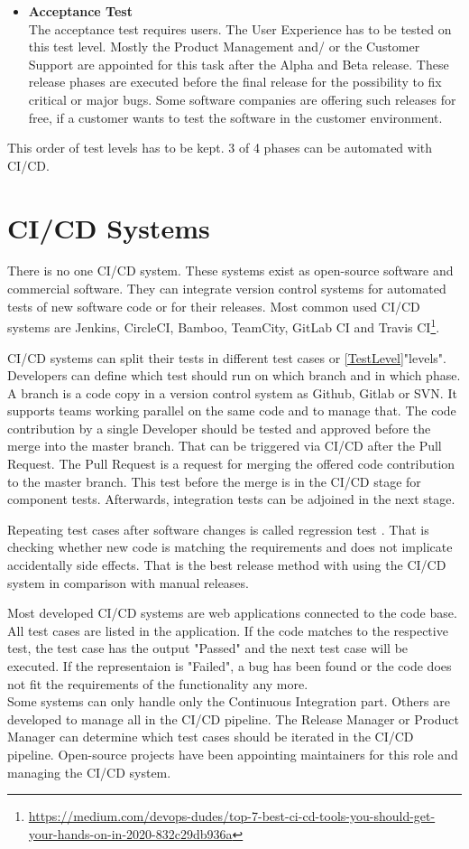 \begin{itemize}
\item \textbf{Acceptance Test} \\
The acceptance test requires users. The User Experience has to be tested on this test level. Mostly the Product Management and/ or the Customer Support are appointed for this task after the Alpha and Beta release. These release phases are executed before the final release for the possibility to fix critical or major bugs.
Some software companies are offering such releases for free, if a customer wants to test the software in the customer environment.
\end{itemize}
This order of test levels has to be kept. 3 of 4 phases can be automated with CI/CD. 

\section{CI/CD Systems}

There is no one CI/CD system. These systems exist as open-source software and commercial software. They can integrate version control systems for automated tests of new software code or for their releases. Most common used CI/CD systems are Jenkins, CircleCI, Bamboo, TeamCity, GitLab CI and Travis CI\footnote{\url{https://medium.com/devops-dudes/top-7-best-ci-cd-tools-you-should-get-your-hands-on-in-2020-832c29db936a}}.

CI/CD systems can split their tests in different test cases or \ref{TestLevel}"levels". Developers can define which test should run on which branch and in which phase. A branch is a code copy in a version control system as Github, Gitlab or SVN. It supports teams working parallel on the same code and to manage that. The code contribution by a single Developer should be tested and approved before the merge into the master branch. That can be triggered via CI/CD after the Pull Request. The Pull Request is a request for merging the offered code contribution to the master branch. This test before the merge is in the CI/CD stage for component tests. Afterwards, integration tests can be adjoined in the next stage.

Repeating test cases after software changes is called regression test \cite[~p.98]{Spillner2019}. That is checking whether new code is matching the requirements and does not implicate accidentally side effects. That is the best release method with using the CI/CD system in comparison with manual releases.

Most developed CI/CD systems are web applications connected to the code base. All test cases are listed in the application. If the code matches to the respective test, the test case has the output "Passed" and the next test case will be executed. If the representaion is "Failed", a bug has been found or the code does not fit the requirements of the functionality any more. \\
Some systems can only handle only the Continuous Integration part. Others are developed to manage all in the CI/CD pipeline.
The Release Manager or Product Manager can determine which test cases should be iterated in the CI/CD pipeline. Open-source projects have been appointing maintainers for this role and managing the CI/CD system.

